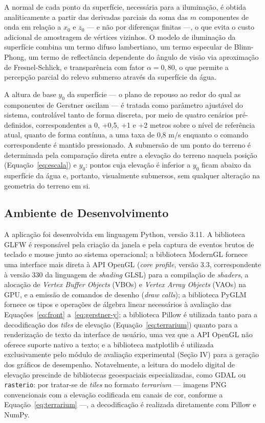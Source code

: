 \documentclass[conference]{IEEEtran}
\begin{document}
A normal de cada ponto da superfície, necessária para a iluminação, é
obtida analiticamente a partir das derivadas parciais da soma das $m$
componentes de onda em relação a $x_0$ e $z_0$ --- e não por diferenças
finitas ---, o que evita o custo adicional de amostragem de vértices
vizinhos. O modelo de iluminação da superfície combina um termo difuso
lambertiano, um termo especular de Blinn-Phong, um termo de reflectância
dependente do ângulo de visão via aproximação de Fresnel-Schlick, e
transparência com fator $\alpha = 0{,}80$, o que permite a percepção
parcial do relevo submerso através da superfície da água.

A altura de base $y_0$ da superfície --- o plano de repouso ao redor do
qual as componentes de Gerstner oscilam --- é tratada como parâmetro
ajustável do sistema, controlável tanto de forma discreta, por meio de
quatro cenários pré-definidos, correspondentes a 0, +0,5, +1 e +2 metros
sobre o nível de referência atual, quanto de forma contínua, a uma taxa
de 0,8 m/s enquanto o comando correspondente é mantido pressionado. A
submersão de um ponto do terreno é determinada pela comparação direta
entre a elevação do terreno naquela posição (Equação~\eqref{eq:escala}) e
$y_0$: pontos cuja elevação é inferior a $y_0$ ficam abaixo da superfície
da água e, portanto, visualmente submersos, sem qualquer alteração na
geometria do terreno em si.

\subsection{Ambiente de Desenvolvimento}

A aplicação foi desenvolvida em linguagem Python, versão 3.11. A
biblioteca GLFW é responsável pela criação da janela e pela captura de
eventos brutos de teclado e mouse junto ao sistema operacional; a
biblioteca ModernGL fornece uma interface mais direta à API OpenGL
(\emph{core profile}, versão 3.3, correspondente à versão 330 da
linguagem de \emph{shading} GLSL) para a compilação de \emph{shaders}, a
alocação de \emph{Vertex Buffer Objects} (VBOs) e \emph{Vertex Array
Objects} (VAOs) na GPU, e a emissão de comandos de desenho (\emph{draw
calls}); a biblioteca PyGLM fornece os tipos e operações de álgebra
linear necessários à avaliação das Equações~\eqref{eq:front}
a~\eqref{eq:gerstner-y}; a biblioteca Pillow é utilizada tanto para a
decodificação dos \emph{tiles} de elevação (Equação~\eqref{eq:terrarium})
quanto para a renderização de texto da interface de usuário, uma vez que
a API OpenGL não oferece suporte nativo a texto; e a biblioteca
matplotlib é utilizada exclusivamente pelo módulo de avaliação
experimental (Seção IV) para a geração dos gráficos de desempenho.
Notavelmente, a leitura do modelo digital de elevação prescinde de
bibliotecas geoespaciais especializadas, como GDAL ou \texttt{rasterio}:
por tratar-se de \emph{tiles} no formato \emph{terrarium} --- imagens PNG
convencionais com a elevação codificada em canais de cor, conforme a
Equação~\eqref{eq:terrarium} ---, a decodificação é realizada diretamente
com Pillow e NumPy.
\end{document}
